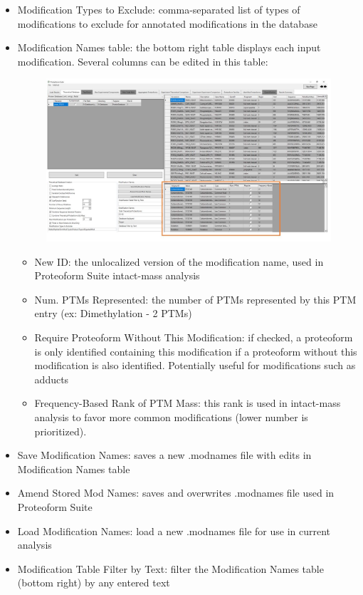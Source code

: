 \begin{itemize}
\item Modification Types to Exclude: comma-separated list of types of modifications to exclude for annotated modifications in the database
\pagebreak
\item Modification Names table: the bottom right table displays each input modification. Several columns can be edited in this table:
\begin{figure}[htbp]
\centering
\includegraphics[scale=0.43]{figures/theoretical.jpg}
\end{figure}
\begin{itemize}
\item New ID: the unlocalized version of the modification name, used in Proteoform Suite intact-mass analysis
\item Num. PTMs Represented: the number of PTMs represented by this PTM entry (ex: Dimethylation - 2 PTMs)
\item Require Proteoform Without This Modification: if checked, a proteoform is only identified containing this modification if a proteoform without this modification is also identified. Potentially useful for modifications such as adducts
\item Frequency-Based Rank of PTM Mass: this rank is used in intact-mass analysis to favor more common modifications (lower number is prioritized).
\end{itemize}
\item Save Modification Names: saves a new .modnames file with edits in Modification Names table
\item Amend Stored Mod Names: saves and overwrites .modnames file used in Proteoform Suite
\item Load Modification Names: load a new .modnames file for use in current analysis
\item Modification Table Filter by Text: filter the Modification Names table (bottom right) by any entered text
\end{itemize}

